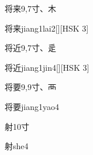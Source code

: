 \begin{entry}{将来}{9,7}{⼨、⽊}
  \begin{phonetics}{将来}{jiang1lai2}[][HSK 3]
  \end{phonetics}
\end{entry}

\begin{entry}{将近}{9,7}{⼨、⾡}
  \begin{phonetics}{将近}{jiang1jin4}[][HSK 3]
  \end{phonetics}
\end{entry}

\begin{entry}{将要}{9,9}{⼨、⾑}
  \begin{phonetics}{将要}{jiang1yao4}
  \end{phonetics}
\end{entry}

\begin{entry}{射}{10}{⼨}
  \begin{phonetics}{射}{she4}
  \end{phonetics}
\end{entry}


